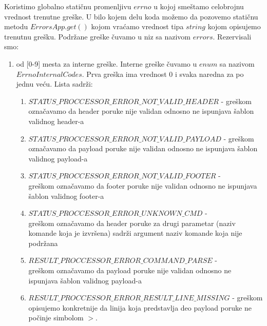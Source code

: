 \documentclass[a4paper]{extarticle}
\begin{document}
	Koristimo globalno statičnu promenljivu $errno$ u kojoj smeštamo celobrojnu vrednost trenutne greške. U bilo kojem delu koda možemo da pozovemo statičnu metodu $ErrorsApp.get()$ kojom vraćamo vrednost tipa $string$ kojom opisujemo trenutnu grešku. Podržane greške čuvamo u niz sa nazivom $errors$. Rezervisali smo:
	\begin{enumerate}
		\item od [0-9] mesta za interne greške. Interne greške čuvamo u $enum$ sa nazivom $ErrnoInternalCodes$. Prva greška ima vrednost 0 i svaka naredna za po jednu veću. Lista sadrži:
		\begin{enumerate}
			\item $STATUS\_PROCCESSOR\_ERROR\_NOT\_VALID\_HEADER$ - greškom označavamo da header poruke nije validan odnosno ne ispunjava šablon validnog header-a
			\item $STATUS\_PROCCESSOR\_ERROR\_NOT\_VALID\_PAYLOAD$ - greškom označavamo da payload poruke nije validan odnosno ne ispunjava šablon validnog payload-a
			\item $STATUS\_PROCCESSOR\_ERROR\_NOT\_VALID\_FOOTER$ -\\
			 greškom označavamo da footer poruke nije validan odnosno ne ispunjava šablon validnog footer-a
			\item $STATUS\_PROCCESSOR\_ERROR\_UNKNOWN\_CMD$ -\\ greškom označavamo da header poruke za drugi parametar (naziv komande koja je izvršena) sadrži argument naziv komande koja nije podržana
			\item $RESULT\_PROCCESSOR\_ERROR\_COMMAND\_PARSE$ -\\greškom označavamo da payload poruke nije validan odnosno ne ispunjava šablon validnog payload-a
			\item $RESULT\_PROCCESSOR\_ERROR\_RESULT\_LINE\_MISSING$ - greškom opisujemo konkretnije da linija koja predstavlja deo payload poruke ne počinje simbolom $>$.
			

\end{enumerate}
\end{enumerate}
\end{document}
